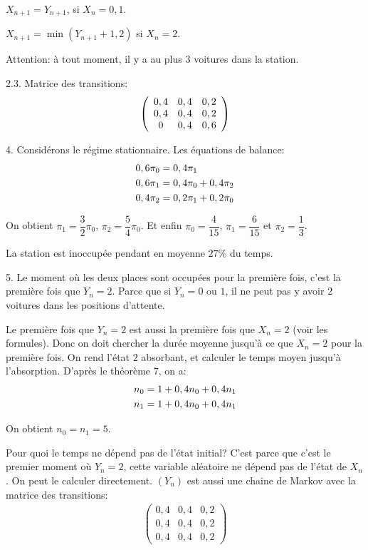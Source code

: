 \documentclass[a4paper,twoside,12pt]{article}
\begin{document}
$X_{n+1} = Y_{n+1}$, si $X_n = 0,1$.

$X_{n+1} = \min(Y_{n+1}+1, 2)$ si $X_n = 2$.

Attention: à tout moment, il y a au plus $3$ voitures dans la station.

2.3. Matrice des transitions:
\begin{align}
    \left(\begin{array}{ccc}
        0,4 & 0,4 & 0,2 \\
        0,4 & 0,4 & 0,2 \\
        0 & 0,4 & 0,6
    \end{array}\right)\notag
\end{align}

4. Considérons le régime stationnaire. Les équations de balance:
\begin{align}
    0,6\pi_0 &= 0,4\pi_1 \notag \\
    0,6\pi_1 &= 0,4\pi_0 + 0,4\pi_2 \notag \\
    0,4\pi_2 &= 0,2\pi_1 + 0,2\pi_0 \notag
\end{align}

On obtient $\pi_1 = \dfrac{3}{2}\pi_0$, $\pi_2 = \dfrac{5}{4}\pi_0$. Et enfin $\pi_0 = \dfrac{4}{15}$, $\pi_1 = \dfrac{6}{15}$ et $\pi_2 = \dfrac{1}{3}$.

La station est inoccupée pendant en moyenne $27\%$ du temps.

5. Le moment où les deux places sont occupées pour la première fois, c'est la première fois que $Y_n = 2$. Parce que si $Y_n = 0$ ou $1$, il ne peut pas y avoir $2$ voitures dans les positions d'attente.

Le première fois que $Y_n=2$ est aussi la première fois que $X_n = 2$ (voir les formules). Donc on doit chercher la durée moyenne jusqu'à ce que $X_n = 2$ pour la première fois. On rend l'état $2$ absorbant, et calculer le temps moyen jusqu'à l'absorption. D'après le théorème $7$, on a:
\begin{align}
    n_0 &= 1 + 0,4n_0 + 0,4n_1 \notag \\
    n_1 &= 1 + 0,4n_0 + 0,4n_1 \notag
\end{align}

On obtient $n_0 = n_1 = 5$.

Pour quoi le temps ne dépend pas de l'état initial? C'est parce que c'est le premier moment où $Y_n = 2$, cette variable aléatoire ne dépend pas de l'état de $X_n$. On peut le calculer directement. $(Y_n)$ est aussi une chaine de Markov avec la matrice des transitions:
\begin{align}
    \left(\begin{array}{ccc}
        0,4 & 0,4 & 0,2 \\
        0,4 & 0,4 & 0,2 \\
        0,4 & 0,4 & 0,2
    \end{array}\right)
\end{align}
\end{document}
